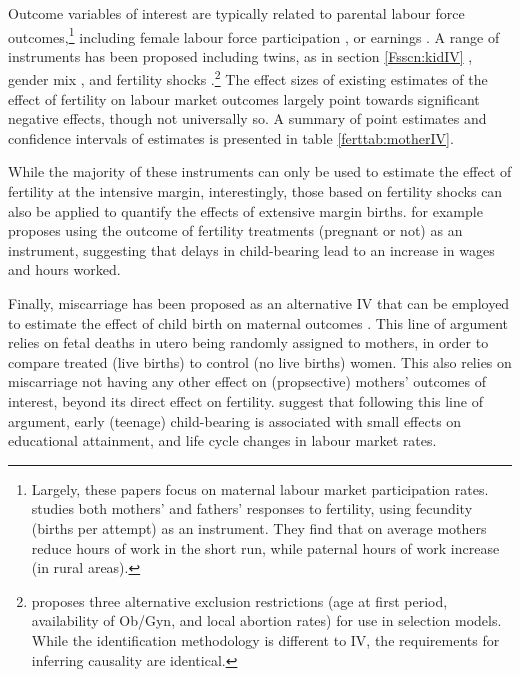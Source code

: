 Outcome variables of interest are typically related to parental labour 
force outcomes,\footnote{Largely, these papers focus on maternal labour
market participation rates. \citet{KimAassve2006} studies both mothers' and
fathers' responses to fertility, using fecundity (births per attempt) as an
instrument.  They find that on average mothers reduce hours of work in the short 
run, while paternal hours of work increase (in rural areas).} including female 
labour force participation \citep{AgueroMarks2008,AgueroMarks2011,ChunOh2002,
Caceres2008,AngristEvans1998}, or earnings \citep{Caceres2006,Hotzetal1997,
Jacobsenetal1999}.  A range of instruments has been proposed including twins,
as in section \ref{Fsscn:kidIV} \citep{RosenzweigWolpin1980b,Jacobsenetal1999,
BronarsGrogger1994}, gender mix \citep{AgueroMarks2008,AgueroMarks2011,
ChunOh2002}, and fertility shocks \citep{Miller2011,Cristia2008,
RosenzweigSchultz1987}.\footnote{\citet{Ribar1994} proposes three alternative
exclusion restrictions (age at first period, availability of Ob/Gyn, and local
abortion rates) for use in selection models.  While the identification 
methodology is different to IV, the requirements for inferring causality are 
identical.}  The effect sizes of existing estimates of the effect of fertility 
on labour market outcomes largely point towards significant negative effects, 
though not universally so.  A summary of point estimates and confidence 
intervals of estimates is presented in table \ref{ferttab:motherIV}.



While the majority of these instruments can only be used to estimate the effect
of fertility at the intensive margin, interestingly, those based on fertility
shocks can also be applied to quantify the effects of extensive margin births. 
\citet{Cristia2008} for example proposes using the outcome of fertility 
treatments (pregnant or not) as an instrument, suggesting that delays in 
child-bearing lead to an increase in wages and hours worked.

Finally, miscarriage has been proposed as an alternative IV that can be employed 
to estimate the effect of child birth on maternal outcomes \citep{Hotzetal2005,
Fletcher2012}. This line of argument relies on fetal deaths in utero being 
randomly assigned to mothers, in order to compare treated (live births) to 
control (no live births) women. This also relies on miscarriage not having any 
other effect on (propsective) mothers' outcomes of interest, beyond its direct 
effect on fertility. \citet{Hotzetal2005} suggest that following this line of 
argument, early (teenage) child-bearing is associated with small effects on 
educational attainment, and life cycle changes in labour market rates.

